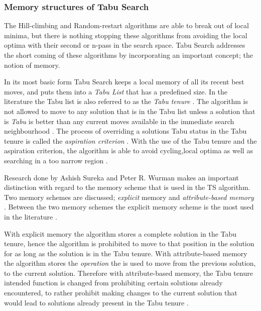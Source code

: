\subsubsection{Memory structures of Tabu Search}
The Hill-climbing and Random-restart algorithms are able to break out of local minima, but there is nothing stopping these algorithms from avoiding the local optima with their second or n-pass in the search space. Tabu Search addresses the short coming of these algorithms by incorporating an important concept; the notion of memory.

In its most basic form Tabu Search keeps a local memory of all its recent best moves, and puts them into a \emph{Tabu List} that has a predefined size. In the literature the Tabu list is also referred to as the \emph{Tabu tenure} \cite{TSHazardous,TabuCarryOver,ReactiveTabuVHR,TabuParameterization}. The algorithm is not allowed to move to any solution that is in the Tabu list unless a solution that is \emph{Tabu} is better than any current moves available in the immediate search neighbourhood \cite{TSHazardous,TabuCarryOver,ReactiveTabuVHR,TabuParameterization}. The process of overriding a solutions Tabu status in the Tabu tenure is called the \emph{aspiration criterion} \cite{TSHazardous,TabuCarryOver,ReactiveTabuVHR,TabuParameterization}. With the use of the Tabu tenure and the aspiration criterion, the algorithm is able to avoid cycling,local optima as well as searching in a too narrow region \cite{TabuSingleMachineScheduling,CircuitTabu}.

Research done by Ashish Sureka and Peter R. Wurman makes an important distinction with regard to the memory scheme that is used in the TS algorithm. Two memory schemes are discussed; \emph{explicit} memory and \emph{attribute-based memory} \cite{TabuBiddingStrats,TabuFormGames}. Between the two memory schemes the explicit memory scheme is the most used in the literature \cite{TabuVechicleRoutingWithTimeWindows}.

With explicit memory the algorithm stores a complete solution in the Tabu tenure, hence the algorithm is prohibited to move to that position in the solution for as long as the solution is in the Tabu tenure\cite{TabuBiddingStrats,TabuFormGames}. With attribute-based memory the algorithm stores the \emph{operation} the is used to move from the previous solution, to the current solution\cite{TabuBiddingStrats,TabuFormGames}. Therefore with attribute-based memory, the Tabu tenure intended function is changed from prohibiting certain solutions already encountered, to rather prohibit making changes to the current solution that would lead to solutions already present in the Tabu tenure \cite{TabuBiddingStrats,TabuFormGames}.

